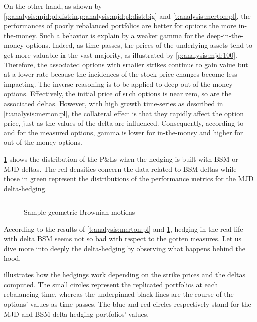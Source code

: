 \documentclass[12pt]{report}
\begin{document}
On the other hand, as shown by \cref{p:analysis:mjd:pl:dist:in,p:analysis:mjd:pl:dist:big} and \cref{t:analysis:merton:pl}, the performances of poorly rebalanced portfolios are better for options the more in-the-money. 
Such a behavior is explain by a weaker gamma for the deep-in-the-money options.
Indeed, as time passes, the prices of the underlying assets tend to get more valuable in the vast majority, as illustrated by \cref{p:analysis:mjd:100}. 
Therefore, the associated options with smaller strikes continue to gain value but at a lower rate because the incidences of the stock price changes become less impacting. 
The inverse reasoning is to be applied to deep-out-of-the-money options. 
Effectively, the initial price of such options is near zero, so are the associated deltas.
However, with high growth time-series as described in \cref{t:analysis:merton:pl}, the collateral effect is that they rapidly affect the option price, just as the values of the delta are influenced.
Consequently, according to and for the measured options, gamma is lower for in-the-money and higher for out-of-the-money options.




\cref{p:analysis:mjd:pl:dist:deltas} shows the distribution of the P\&Ls when the hedging is built with BSM or MJD deltas. The red densities concern the data related to BSM deltas while those in green represent the distributions of the performance metrics for the MJD delta-hedging.

\begin{figure}[h]
  \centering
  \rule{40mm}{20mm}
  \caption{Sample geometric Brownian motions}
  \label{p:analysis:mjd:pl:dist:deltas}
\end{figure}

According to the results of \cref{t:analysis:merton:pl} and \cref{p:analysis:mjd:pl:dist:deltas}, hedging in the real life with delta BSM seems not so bad with respect to the gotten measures.
Let us dive more into deeply the delta-hedging by observing what happens behind the hood.

 illustrates how the hedgings work depending on the strike prices and the deltas computed.
The small circles represent the replicated portfolios at each rebalancing time, whereas the underpinned black lines are the course of the options' values as time passes. The blue and red circles respectively stand for the MJD and BSM delta-hedging portfolios' values.
\end{document}
